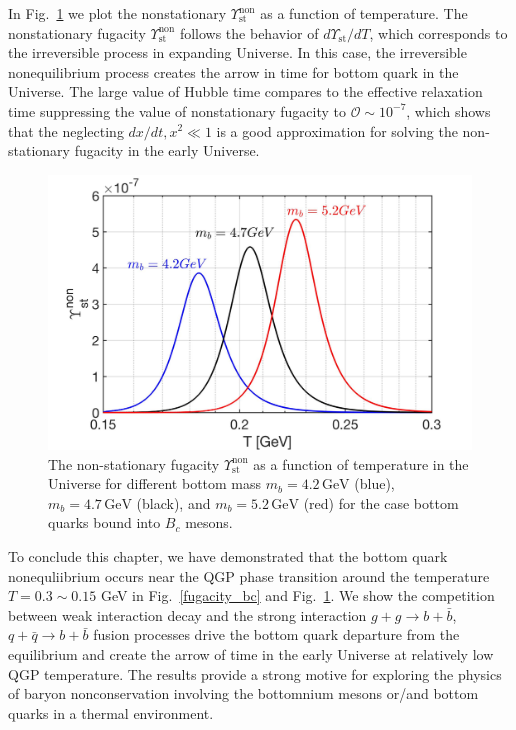 In Fig.~\ref{NonFugacity} we plot the nonstationary $\Upsilon^{\mathrm{non}}_\mathrm{st}$ as a function of temperature. The nonstationary fugacity $\Upsilon^{\mathrm{non}}_\mathrm{st}$ follows the behavior of $d\Upsilon_{\mathrm{st}}/dT$, which corresponds to the irreversible process in expanding Universe. In this case, the irreversible nonequilibrium process creates the arrow in time for bottom quark in the Universe. The large value of Hubble time compares to the effective relaxation time suppressing the value of nonstationary fugacity to $\mathcal{O}\sim10^{-7}$, which shows that the neglecting $dx/dt,x^2\ll1$ is a good approximation for solving the non-stationary fugacity in the early Universe.
\begin{figure}[t]
\begin{center}
\includegraphics[width=\textwidth]{./plots/NonstationaryFugacity}
\caption{The non-stationary fugacity $\Upsilon_\mathrm{st}^{\mathrm{non}}$ as a function of temperature in the Universe for different bottom mass $m_b=4.2\,\mathrm{GeV}$ (blue), $m_b=4.7\,\mathrm{GeV}$ (black), and $m_b=5.2\,\mathrm{GeV}$ (red) for the case bottom  quarks bound into $B_c$ mesons.}
\label{NonFugacity}
\end{center}
\end{figure}

To conclude this chapter, we have demonstrated that the bottom quark nonequliibrium occurs near the QGP phase transition around the temperature $T=0.3\sim0.15$ GeV in Fig.~\ref{fugacity_bc} and Fig.~\ref{NonFugacity}. We show the competition between weak interaction decay and the strong interaction $g+g\to b+\bar b$, $q+\bar q \to b+\bar b$ fusion processes drive the bottom quark departure from the equilibrium and create the arrow of time in the early Universe at relatively low QGP temperature. The results provide a strong motive for exploring the physics of baryon nonconservation involving the bottomnium mesons or/and bottom quarks in a thermal environment.

